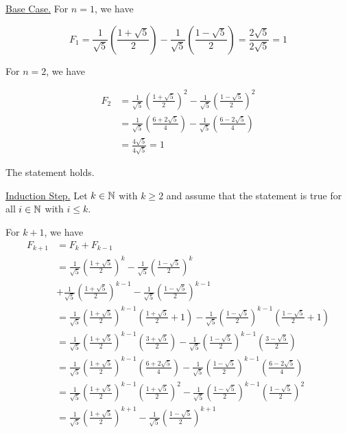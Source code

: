 	\bs
	\underline{Base Case.} For $n = 1$, we have

	$$F_1 = 
			\frac{1}{\sqrt{5}} \left( \frac{1 + \sqrt{5}}{2} \right)
			- \frac{1}{\sqrt{5}} \left( \frac{1 - \sqrt{5}}{2} \right)
			= \frac{2 \sqrt{5}}{2 \sqrt{5}} = 1$$
	
	\pagebreak
	
	For $n = 2$, we have

	\begin{align*}
		F_2 &= 
			\frac{1}{\sqrt{5}} \left( \frac{1 + \sqrt{5}}{2} \right)^2
			- \frac{1}{\sqrt{5}} \left( \frac{1 - \sqrt{5}}{2} \right)^2 \\
				&= \frac{1}{\sqrt{5}} \left( \frac{6 + 2\sqrt{5}}{4} \right)
			- \frac{1}{\sqrt{5}} \left( \frac{6 - 2\sqrt{5}}{4} \right) \\
				&= \frac{4 \sqrt{5}}{4 \sqrt{5}} = 1
	\end{align*}

	The statement holds.

	\underline{Induction Step.} Let $k \in \mathbb{N}$ with $k \geq 2$ and assume that the statement is true for all $i \in \mathbb{N}$ with $i \leq k$.

	For $k+1$, we have
	\begin{align*}
		F_{k+1} &= F_k + F_{k-1} \\
						&= \frac{1}{\sqrt{5}} \left( \frac{1+\sqrt{5}}{2} \right)^k
						- \frac{1}{\sqrt{5}} \left( \frac{1-\sqrt{5}}{2} \right)^k \\
						&+ \frac{1}{\sqrt{5}} \left( \frac{1+\sqrt{5}}{2} \right)^{k-1}
						- \frac{1}{\sqrt{5}} \left( \frac{1-\sqrt{5}}{2} \right)^{k-1} \\
						&= \frac{1}{\sqrt{5}} \left( \frac{1+\sqrt{5}}{2} \right)^{k-1} 
							\left( \frac{1+\sqrt{5}}{2} + 1 \right)
						- \frac{1}{\sqrt{5}} \left( \frac{1-\sqrt{5}}{2} \right)^{k-1} 
							\left( \frac{1-\sqrt{5}}{2} + 1 \right) \\
						&= \frac{1}{\sqrt{5}} \left( \frac{1+\sqrt{5}}{2} \right)^{k-1} 
							\left( \frac{3+\sqrt{5}}{2} \right)
						- \frac{1}{\sqrt{5}} \left( \frac{1-\sqrt{5}}{2} \right)^{k-1} 
							\left( \frac{3-\sqrt{5}}{2} \right) \\
						&= \frac{1}{\sqrt{5}} \left( \frac{1+\sqrt{5}}{2} \right)^{k-1} 
							\left( \frac{6+2\sqrt{5}}{4} \right)
						- \frac{1}{\sqrt{5}} \left( \frac{1-\sqrt{5}}{2} \right)^{k-1} 
							\left( \frac{6-2\sqrt{5}}{4} \right) \\
						&= \frac{1}{\sqrt{5}} \left( \frac{1+\sqrt{5}}{2} \right)^{k-1} 
							\left( \frac{1+\sqrt{5}}{2} \right)^2
						- \frac{1}{\sqrt{5}} \left( \frac{1-\sqrt{5}}{2} \right)^{k-1} 
							\left( \frac{1-\sqrt{5}}{2} \right)^2 \\
						&= \frac{1}{\sqrt{5}} \left( \frac{1+\sqrt{5}}{2} \right)^{k+1} 
						- \frac{1}{\sqrt{5}} \left( \frac{1-\sqrt{5}}{2} \right)^{k+1}
	\end{align*}

